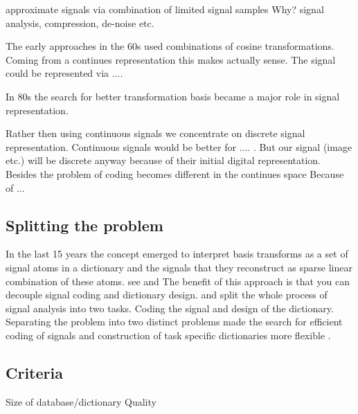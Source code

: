 approximate signals via combination of limited signal samples
Why?
signal analysis, compression, de-noise etc.

The early approaches in the 60s used combinations of cosine transformations. Coming from a continues representation this makes 
actually sense. The signal could be represented via ....

In 80s the search for better transformation basis became a major role in signal representation. \cite{}

Rather then using continuous signals we concentrate on discrete signal representation.
Continuous signals would be better for .... . But our signal (image etc.) will be discrete anyway because of their initial digital representation. 
Besides the problem of coding becomes different in the continues space \cite{} Because of ...

\subsection{Splitting the problem}
\cite{Rubinstein2010}
In the last 15 years the concept emerged to interpret basis transforms as a set of signal atoms in a dictionary and the signals 
that they reconstruct as sparse linear combination of these atoms.
see \cite{Olshausen1997} and \cite{}
The benefit of this approach is that you can decouple signal coding and dictionary design.
and split the whole process of signal analysis into two tasks. Coding the signal and design of the dictionary.
Separating the problem into two distinct problems made the search for efficient coding of signals and construction of task specific dictionaries more flexible \cite{?}.

\subsection{Criteria}

Size of database/dictionary
Quality




